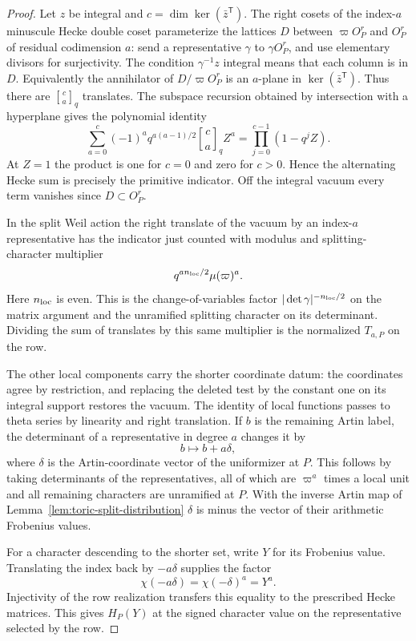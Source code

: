 \begin{proof}
Let \(z\) be integral and \(c=\dim\ker(\bar z^{\mathsf T})\).
The right cosets of the index-\(a\) minuscule Hecke double
coset parameterize the lattices \(D\) between
\(\varpi O_P^r\) and \(O_P^r\) of residual codimension \(a\):
send a representative \(\gamma\) to \(\gamma O_P^r\), and
use elementary divisors for surjectivity. The condition
\(\gamma^{-1}z\) integral means that each column is in
\(D\). Equivalently the annihilator of \(D/\varpi O_P^r\)
is an \(a\)-plane in \(\ker(\bar z^{\mathsf T})\).
Thus there are \(\genfrac{[}{]}{0pt}{}{c}{a}_q\) translates.
The subspace recursion obtained by intersection with a hyperplane
gives the polynomial identity
\[
 \sum_{a=0}^c (-1)^a q^{a(a-1)/2}
    \genfrac{[}{]}{0pt}{}{c}{a}_q Z^a
   =\prod_{j=0}^{c-1}(1-q^jZ).
\]
At \(Z=1\) the product is one for \(c=0\) and zero for \(c>0\).
Hence the alternating Hecke sum is precisely the primitive
indicator. Off the integral vacuum every term vanishes since
\(D\subset O_P^r\).

In the split Weil action the right translate of the vacuum
by an index-\(a\) representative has the indicator just
counted with modulus and splitting-character multiplier
\[
 q^{a n_{\rm loc}/2}\mu(\varpi)^a.
\]
Here \(n_{\rm loc}\) is even. This is
the change-of-variables factor \(|\det\gamma|^{-n_{\rm loc}/2}\)
on the matrix argument and the unramified splitting
character on its determinant. Dividing the sum of translates
by this same multiplier is the normalized \(T_{a,P}\) on the
row.

The other local components carry the shorter coordinate
datum: the coordinates agree by restriction, and replacing
the deleted test by the constant one on its integral support
restores the vacuum. The identity of local functions passes
to theta series by linearity and right translation. If \(b\) is the remaining Artin label, the determinant of a representative in degree \(a\) changes it by
\[
 b\longmapsto b+a\delta,
\]
where \(\delta\) is the Artin-coordinate vector of the uniformizer at \(P\). This follows
by taking determinants of the representatives, all of which
are \(\varpi^a\) times a local unit and all remaining
characters are unramified at \(P\). With the inverse Artin map of Lemma~\ref{lem:toric-split-distribution} \(\delta\) is minus the vector of
their arithmetic Frobenius values.

For a character descending to the shorter set, write \(Y\) for its Frobenius value. Translating the index back by \(-a\delta\) supplies the factor
\[
 \chi(-a\delta)=\chi(-\delta)^a=Y^a.
\]
Injectivity of
the row realization transfers this equality to the prescribed
Hecke matrices. This gives \(H_P(Y)\) at the signed character
value on the representative selected by the row.


\end{proof}
